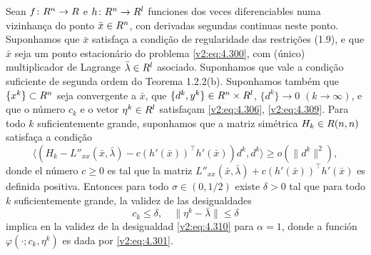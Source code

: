 \begin{theorem}\label{v2:thm:4.6.4}
    Sean $f \colon R^n \to R$ e $h \colon R^n \to R^l$ funciones dos veces diferenciables numa vizinhança do ponto $\bar{x} \in R^n$, con derivadas segundas continuas neste ponto. Suponhamos que $\bar{x}$ satisfaça a condição de regularidade das restrições (1.9), e que $\bar{x}$ seja um ponto estacionário do problema \eqref{v2:eq:4.300}, com (único) multiplicador de Lagrange $\bar{\lambda} \in R^l$ asociado. Suponhamos que vale a condição suficiente de segunda ordem do Teorema 1.2.2(b).
    Suponhamos também que $\{x^k\} \subset R^n$ seja convergente a $\bar{x}$, que $\{d^k, y^k\} \in R^n \times R^l$, $\{d^k\} \to 0$ $(k \to \infty)$, e que o número $c_k$ e o vetor $\eta^k \in R^l$ satisfaçam \eqref{v2:eq:4.306}, \eqref{v2:eq:4.309}.
    Para todo $k$ suficientemente grande, suponhamos que a matriz simétrica $H_k \in R(n, n)$ satisfaça a condição
    \begin{equation}
        \langle (H_k - L''_{xx}(\bar{x}, \bar{\lambda}) - c(h'(\bar{x}))^\top h'(\bar{x}))d^k, d^k \rangle \ge o(\|d^k\|^2),
        \label{v2:eq:4.311}
    \end{equation}
    donde el número $c \ge 0$ es tal que la matriz $L''_{xx}(\bar{x}, \bar{\lambda}) + c(h'(\bar{x}))^\top h'(\bar{x})$ es definida positiva.
    Entonces para todo $\sigma \in (0, 1/2)$ existe $\delta > 0$ tal que para todo $k$ suficientemente grande, la validez de las desigualdades
    \begin{equation}
        c_k \le \delta, \quad \|\eta^k - \bar{\lambda}\| \le \delta
        \label{v2:eq:4.312}
    \end{equation}
    implica en la validez de la desigualdad \eqref{v2:eq:4.310} para $\alpha = 1$, donde a función $\varphi(\cdot; c_k, \eta^k)$ es dada por \eqref{v2:eq:4.301}.
\end{theorem}
